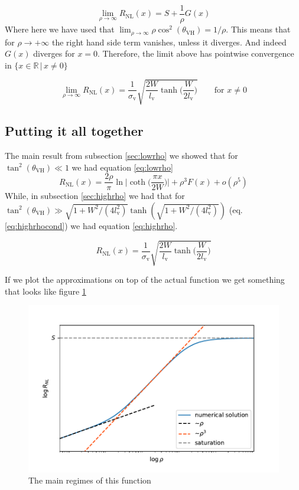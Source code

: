 \begin{equation}
    \lim_{\rho\to\infty} R_{\textrm{NL}}(x)=S + \frac 1\rho G(x)
\end{equation}
Where here we have used that $\lim_{\rho\to \infty}\rho\cos^2(\theta_{\textrm{VH}})=1/\rho$.
This means that for $\rho\to +\infty$ the right hand side term vanishes, unless it diverges. And indeed $G(x)$ diverges for $x=0$. Therefore, the limit above has pointwise convergence in $\{x\in \mathbb R\,|\,x\neq 0\}$

\begin{equation}
    \lim_{\rho\to\infty} R_{\textrm{NL}}(x) = \frac 1{\sigma_{\textrm{v}}}\sqrt{\frac {2W}{l_{\textrm{v}}}\tanh\bigg(\frac W{2l_{\textrm{v}}} \bigg)}
    \quad\quad \textrm{for }x\neq 0
    \label{eq:highrho}
\end{equation}














\subsection{Putting it all together}
The main result from subsection \ref{sec:lowrho} we showed that for $\tan^2(\theta_{\textrm{VH}})\ll 1$ we had equation \ref{eq:lowrho}
\[
    R_{\textrm{NL}}(x)=
    \frac{2\rho}\pi\ln\bigg |\coth \Big(\frac{\pi x}{2W}\Big)\bigg | +
    \rho^3F(x) +
    o(\rho^5)
\]
While, in subsection \ref{sec:highrho} we had that for $\tan^2(\theta_{\textrm{VH}})\gg \sqrt{1+W^2/(4l_{\textrm{v}}^2)}\tanh\left(\sqrt{1+W^2/(4l_{\textrm{v}}^2)}\right)$ (eq. \ref{eq:highrhocond}) we had equation \ref{eq:highrho}.

\[
    R_{\textrm{NL}}(x) = \frac 1{\sigma_{\textrm{v}}}\sqrt{\frac {2W}{l_{\textrm{v}}}\tanh\bigg(\frac W{2l_{\textrm{v}}} \bigg)}
\]

If we plot the approximations on top of the actual function we get something that looks like figure \ref{fig:all_approx_rho}
\begin{figure}[h!]
    \centering
    \includegraphics[width=\linewidth]{Immagini/rnl/all_approx_rho.pdf}
    \caption{The main regimes of this function}
    \label{fig:all_approx_rho}
\end{figure}\\


